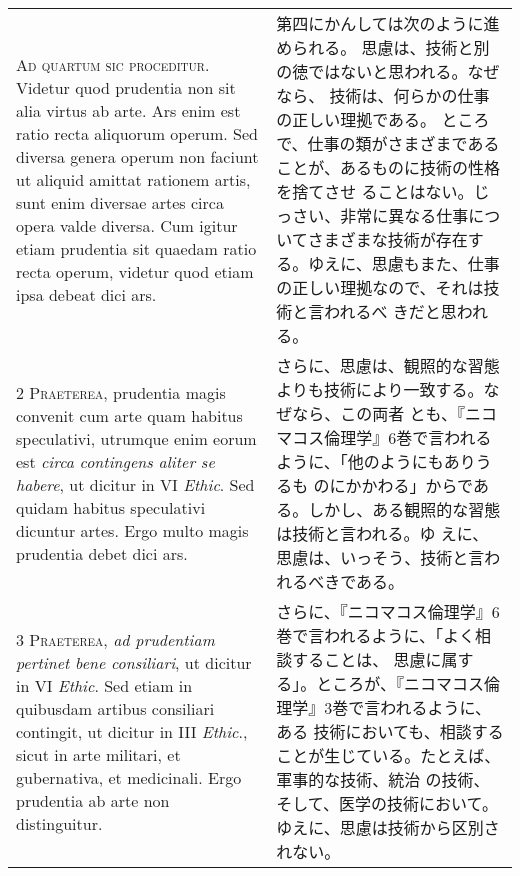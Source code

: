 \documentclass[10pt]{jsarticle} %
\begin{document}
\begin{longtable}{p{21em}p{21em}}

{\huge A}{\scshape d quartum sic proceditur}. Videtur
 quod prudentia non sit alia virtus ab arte. Ars enim est ratio recta
 aliquorum operum. Sed diversa genera operum non faciunt ut aliquid
 amittat rationem artis, sunt enim diversae artes circa opera valde
 diversa. Cum igitur etiam prudentia sit quaedam ratio recta operum,
 videtur quod etiam ipsa debeat dici ars.


&
第四にかんしては次のように進められる。
思慮は、技術と別の徳ではないと思われる。なぜなら、
技術は、何らかの仕事の正しい理拠である。
ところで、仕事の類がさまざまであることが、あるものに技術の性格を捨てさせ
 ることはない。じっさい、非常に異なる仕事についてさまざまな技術が存在す
 る。ゆえに、思慮もまた、仕事の正しい理拠なので、それは技術と言われるべ
 きだと思われる。

\\



{\scshape 2 Praeterea}, prudentia magis convenit cum arte quam habitus
 speculativi, utrumque enim eorum est {\itshape circa contingens aliter
 se habere}, ut dicitur in VI {\itshape Ethic}. Sed quidam habitus
 speculativi dicuntur artes. Ergo multo magis prudentia debet dici ars.


&
さらに、思慮は、観照的な習態よりも技術により一致する。なぜなら、この両者
 とも、『ニコマコス倫理学』6巻で言われるように、「他のようにもありうるも
 のにかかわる」からである。しかし、ある観照的な習態は技術と言われる。ゆ
 えに、思慮は、いっそう、技術と言われるべきである。

\\



{\scshape 3 Praeterea}, {\itshape ad prudentiam pertinet bene
 consiliari}, ut dicitur in VI {\itshape Ethic}. Sed etiam in quibusdam
 artibus consiliari contingit, ut dicitur in III {\itshape Ethic}.,
 sicut in arte militari, et gubernativa, et medicinali. Ergo prudentia
 ab arte non distinguitur.

&
さらに、『ニコマコス倫理学』6巻で言われるように、「よく相談することは、
 思慮に属する」。ところが、『ニコマコス倫理学』3巻で言われるように、ある
 技術においても、相談することが生じている。たとえば、軍事的な技術、統治
 の技術、そして、医学の技術において。ゆえに、思慮は技術から区別されない。


\\




\end{longtable}
\end{document}
